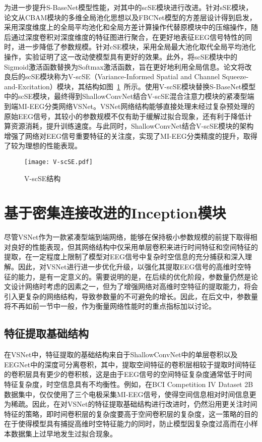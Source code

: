 为进一步提升S-BaseNet模型性能，对其中的scSE模块进行改进。针对sSE模块，论文从CBAM模块的多维全局池化思想以及FBCNet模型的方差层设计\cite{mane2021fbcnet}得到启发，采用深度维度上的全局平均池化和全局方差计算操作代替原模块中的压缩操作，随后通过深度卷积对深度维度的特征图进行聚合，在更好地表征EEG信号特性的同时，进一步降低了参数规模。针对cSE模块，采用全局最大池化取代全局平均池化操作，实验证明了这一改动使模型具有更好的效果。此外，将scSE模块中的Sigmoid激活函数替换为Softmax激活函数，旨在更好地利用全局信息。论文将改良后的scSE模块称为V-scSE（Variance-Informed Spatial and Channel Squeeze-and-Excitation）模块，其结构如图~\ref{fig:V-scSE}~所示。使用V-scSE模块替换S-BaseNet模型中的scSE模块，最终得到ShallowConvNet结合V-scSE混合注意力模块的紧凑型端到端MI-EEG分类网络VSNet。VSNet网络结构能够直接处理未经过复杂预处理的原始EEG信号，其较小的参数规模不仅有助于缓解过拟合现象，还有利于降低计算资源消耗，提升训练速度。与此同时，ShallowConvNet结合V-scSE模块的架构增强了网络对EEG信号重要特征的关注度，实现了MI-EEG分类精度的提升，取得了较为理想的性能表现。
\begin{figure}
  \centering
  \texttt{[image: V-scSE.pdf]}
  \caption{V-scSE结构}
  \label{fig:V-scSE}
\end{figure}

\section{基于密集连接改进的Inception模块}

尽管VSNet作为一款紧凑型端到端网络，能够在保持极小参数规模的前提下取得相对良好的性能表现，但其网络结构中仅采用单层卷积来进行时间特征和空间特征的提取，在一定程度上限制了模型对EEG信号中复杂时空信息的充分捕获和深入理解。因此，对VSNet进行进一步优化升级，以强化其提取EEG信号的高维时空特征的能力，是有一定意义的。需要说明的是，在后续的优化阶段，参数量仍然是论文设计网络时考虑的因素之一，但为了增强网络对高维时空特征的提取能力，将会引入更复杂的网络结构，导致参数量的不可避免的增长。因此，在后文中，参数量将不再如前一节中一般，作为衡量网络性能时的重点指标加以讨论。

\subsection{特征提取基础结构}

在VSNet中，特征提取的基础结构来自于ShallowConvNet中的单层卷积以及EEGNet中的深度可分离卷积，其中，提取空间特征的卷积层相较于提取时间特征的卷积层具有更少的卷积核，这是由于EEG信号的空间特征复杂度通常低于时间特征复杂度，时空信息具有不均衡性。例如，在BCI Competition IV Dataset 2B\cite{tangermann2012review}数据集中，仅仅使用了三个电极采集MI-EEG信号，使得空间信息相对时间信息更为稀疏。因此，在对VSNet的特征提取基础结构进行改进时，仍然沿用更关注时间特征的策略，即时间卷积层的复杂度要高于空间卷积层的复杂度，这一策略的目的在于使得模型具有捕捉高维时空特征能力的同时，防止模型因复杂度过高而在小样本数据集上过早地发生过拟合现象。

